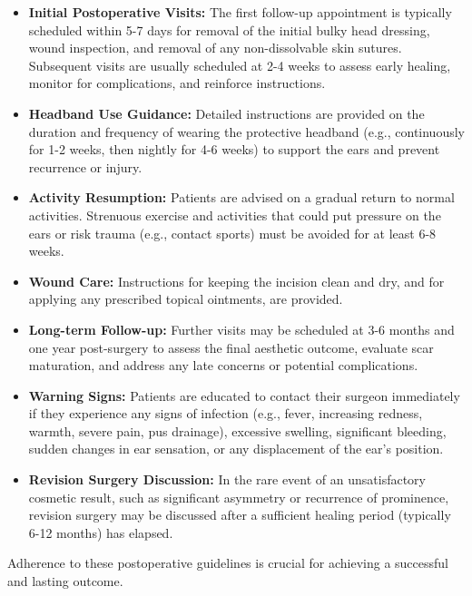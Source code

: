 \begin{itemize}
  \item \textbf{Initial Postoperative Visits:} The first follow-up appointment is typically scheduled within 5-7 days for removal of the initial bulky head dressing, wound inspection, and removal of any non-dissolvable skin sutures. Subsequent visits are usually scheduled at 2-4 weeks to assess early healing, monitor for complications, and reinforce instructions.
  \item \textbf{Headband Use Guidance:} Detailed instructions are provided on the duration and frequency of wearing the protective headband (e.g., continuously for 1-2 weeks, then nightly for 4-6 weeks) to support the ears and prevent recurrence or injury.
  \item \textbf{Activity Resumption:} Patients are advised on a gradual return to normal activities. Strenuous exercise and activities that could put pressure on the ears or risk trauma (e.g., contact sports) must be avoided for at least 6-8 weeks.
  \item \textbf{Wound Care:} Instructions for keeping the incision clean and dry, and for applying any prescribed topical ointments, are provided.
  \item \textbf{Long-term Follow-up:} Further visits may be scheduled at 3-6 months and one year post-surgery to assess the final aesthetic outcome, evaluate scar maturation, and address any late concerns or potential complications.
  \item \textbf{Warning Signs:} Patients are educated to contact their surgeon immediately if they experience any signs of infection (e.g., fever, increasing redness, warmth, severe pain, pus drainage), excessive swelling, significant bleeding, sudden changes in ear sensation, or any displacement of the ear's position.
  \item \textbf{Revision Surgery Discussion:} In the rare event of an unsatisfactory cosmetic result, such as significant asymmetry or recurrence of prominence, revision surgery may be discussed after a sufficient healing period (typically 6-12 months) has elapsed.
\end{itemize}
Adherence to these postoperative guidelines is crucial for achieving a successful and lasting outcome.

